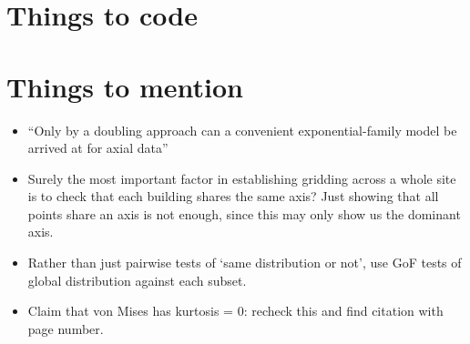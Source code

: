 \documentclass[10pt,fleqn]{article}
\begin{document}
\section*{Things to code}
\vspace{-15pt}






\section*{Things to mention}
\begin{itemize}

\item 
``Only by a doubling approach can a convenient exponential-family model be arrived at for axial data'' \cite{Arnold2011}

\item
Surely the most important factor in establishing gridding across a whole site is to check that each building shares the same axis? Just showing that all points share an axis is not enough, since this may only show us the dominant axis.
 
\item
Rather than just pairwise tests of `same distribution or not', use GoF tests of global distribution against each subset.

\item
Claim that von Mises has kurtosis = 0: recheck this and find citation with page number.
\end{itemize}


\newpage




\end{document}
